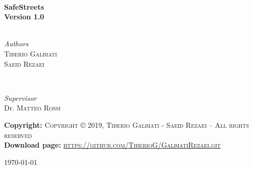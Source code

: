 \begin{titlepage}
	\HRule\\[0.4cm]

	{\huge\bfseries SafeStreets}\\[0.4cm]
	\textbf{Version 1.0}\\

	\HRule\\[1.5cm]


	\begin{minipage}{0.4\textwidth}
		\begin{flushleft}
			\large
			\textit{Authors}\\
			 \textsc{Tiberio Galbiati} \\
			 \textsc{Saeid Rezaei}
		\end{flushleft}
	\end{minipage}
	~
	\begin{minipage}{0.4\textwidth}
		\begin{flushright}
			\large
			\textit{Supervisor}\\
			Dr. \textsc {Matteo Rossi}
		\end{flushright}
	\end{minipage}


\vfill\vfil
	\textbf{Copyright:} \textsc{ Copyright © 2019,  Tiberio Galbiati - Saeid Rezaei  – All rights reserved }\\[0.5cm]
	\textbf{Download page:} \textsc{ \url{https://github.com/TiberioG/GalbiatiRezaei.git} }\\[0.5cm]



	\vfill\vfill\vfill %

	{\large\today} %





	\vfill

\end{titlepage}






